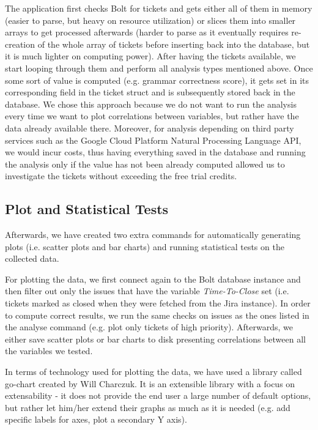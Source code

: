 \documentclass{mpaper}
\begin{document}
The application first checks Bolt for tickets and gets either all of them in memory (easier to parse, 
but heavy on resource utilization) or slices them into smaller arrays to get processed afterwards (harder to parse as it 
eventually requires re-creation of the whole array of tickets before inserting back into the database, but it is much 
lighter on computing power). After having the tickets available, we start looping through them and perform all 
analysis types mentioned above. Once some sort of value is computed (e.g. grammar correctness score), it gets set in 
its corresponding field in the ticket struct and is subsequently stored back in the database. We chose this approach because 
we do not want to run the analysis every time we want to plot correlations between variables, but rather have the data 
already available there. Moreover, for analysis depending on third party services such as the Google Cloud Platform 
Natural Processing Language API, we would incur costs, thus having everything saved in the database and running the 
analysis only if the value has not been already computed allowed us to investigate the tickets without exceeding the 
free trial credits.

\subsection{Plot and Statistical Tests}

Afterwards, we have created two extra commands for automatically generating plots (i.e. scatter plots and bar charts) and 
running statistical tests on the collected data. 

For plotting the data, we first connect again to the Bolt database instance and then filter out only the issues that have 
the variable \emph{Time-To-Close} set (i.e. tickets marked as closed when they were fetched from the Jira instance). 
In order to compute correct results, we run the same checks on issues as the ones listed in the analyse command (e.g. plot 
only tickets of high priority). Afterwards, we either save scatter plots or bar charts to disk presenting correlations 
between all the variables we tested.

In terms of technology used for plotting the data, we have used a library called go-chart \cite{go-chart} created by 
Will Charczuk. It is an extensible library with a focus on extensability - it does not provide the end user a large number 
of default options, but rather let him/her extend their graphs as much as it is needed (e.g. add specific labels for axes, 
plot a secondary Y axis).
\end{document}

